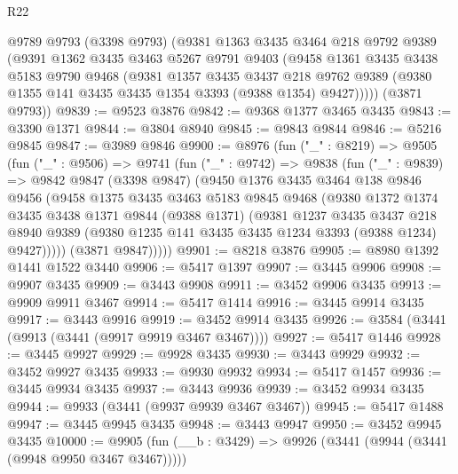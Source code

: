 \begin{lexlean}{R22}
\begin{coremodule}
    @9789
      @9793
      (@3398 @9793)
      (@9381
        @1363
        @3435
        @3464
        @218
        @9792
        @9389
        (@9391
          @1362
          @3435
          @3463
          @5267
          @9791
          @9403
          (@9458
            @1361
            @3435
            @3438
            @5183
            @9790
            @9468
            (@9381
              @1357
              @3435
              @3437
              @218
              @9762
              @9389
              (@9380 @1355 @141 @3435 @3435 @1354 @3393 (@9388 @1354) @9427)))))
      (@3871 @9793))
@9839 := @9523 @3876
@9842 := @9368 @1377 @3465 @3435
@9843 := @3390 @1371
@9844 := @3804 @8940
@9845 := @9843 @9844
@9846 := @5216 @9845
@9847 := @3989 @9846
@9900 := @8976
    (fun ("_" : @8219) =>
    @9505
      (fun ("_" : @9506) =>
      @9741
        (fun ("_" : @9742) =>
        @9838
          (fun ("_" : @9839) =>
          @9842
            @9847
            (@3398 @9847)
            (@9450
              @1376
              @3435
              @3464
              @138
              @9846
              @9456
              (@9458
                @1375
                @3435
                @3463
                @5183
                @9845
                @9468
                (@9380
                  @1372
                  @1374
                  @3435
                  @3438
                  @1371
                  @9844
                  (@9388 @1371)
                  (@9381
                    @1237
                    @3435
                    @3437
                    @218
                    @8940
                    @9389
                    (@9380 @1235 @141 @3435 @3435 @1234 @3393 (@9388 @1234) @9427)))))
            (@3871 @9847)))))
@9901 := @8218 @3876
@9905 := @8980 @1392 @1441 @1522 @3440
@9906 := @5417 @1397
@9907 := @3445 @9906
@9908 := @9907 @3435
@9909 := @3443 @9908
@9911 := @3452 @9906 @3435
@9913 := @9909 @9911 @3467
@9914 := @5417 @1414
@9916 := @3445 @9914 @3435
@9917 := @3443 @9916
@9919 := @3452 @9914 @3435
@9926 := @3584 (@3441 (@9913 (@3441 (@9917 @9919 @3467 @3467))))
@9927 := @5417 @1446
@9928 := @3445 @9927
@9929 := @9928 @3435
@9930 := @3443 @9929
@9932 := @3452 @9927 @3435
@9933 := @9930 @9932
@9934 := @5417 @1457
@9936 := @3445 @9934 @3435
@9937 := @3443 @9936
@9939 := @3452 @9934 @3435
@9944 := @9933 (@3441 (@9937 @9939 @3467 @3467))
@9945 := @5417 @1488
@9947 := @3445 @9945 @3435
@9948 := @3443 @9947
@9950 := @3452 @9945 @3435
@10000 := @9905
    (fun (__b : @3429) => @9926 (@3441 (@9944 (@3441 (@9948 @9950 @3467 @3467)))))

\end{coremodule}
\end{lexlean}
